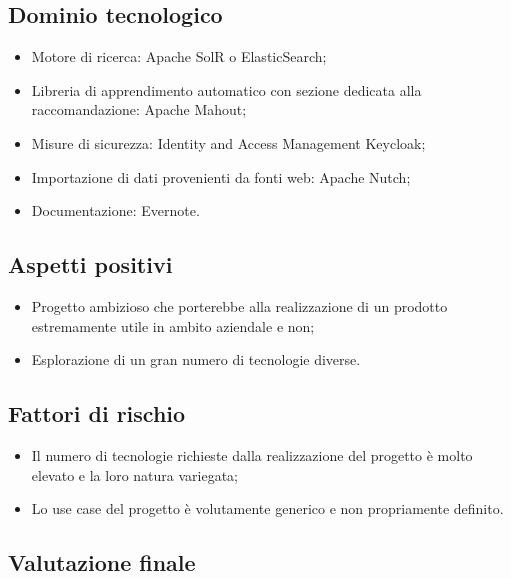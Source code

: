 \documentclass[openany,12pt,a4paper]{report}
\begin{document}
\subsection{Dominio tecnologico}

\begin{itemize}
    \item{Motore di ricerca:} Apache SolR o ElasticSearch;
    
    \item{Libreria di apprendimento automatico con sezione dedicata alla raccomandazione:} Apache Mahout;
    
    \item{Misure di sicurezza:} Identity and Access Management Keycloak;
    
    \item{Importazione di dati provenienti da fonti web:} Apache Nutch;
    
    \item{Documentazione:} Evernote.
\end{itemize}

\subsection{Aspetti positivi}

\begin{itemize}
    \item Progetto ambizioso che porterebbe alla realizzazione di un prodotto estremamente utile in ambito aziendale e non;
    
    \item Esplorazione di un gran numero di tecnologie diverse.
\end{itemize}
\subsection{Fattori di rischio}

\begin{itemize}
    \item Il numero di tecnologie richieste dalla realizzazione del progetto è molto elevato e la loro natura variegata;
    
    \item Lo use case del progetto è volutamente generico e non propriamente definito.
\end{itemize}

\subsection{Valutazione finale}
\end{document}
